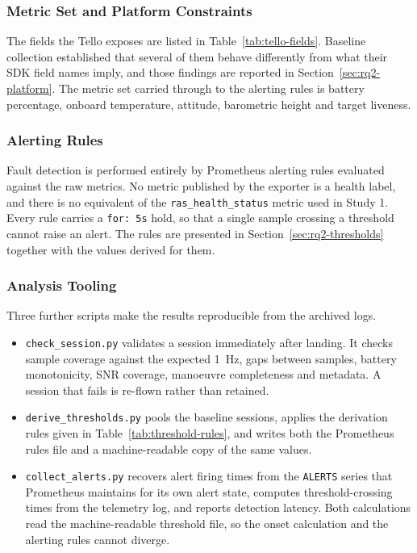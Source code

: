 \subsubsection{Metric Set and Platform Constraints}\label{sec:rq2-metrics}

The fields the Tello exposes are listed in Table~\ref{tab:tello-fields}.
Baseline collection established that several of them behave differently from
what their SDK field names imply, and those findings are reported in
Section~\ref{sec:rq2-platform}. The metric set carried through to the alerting
rules is battery percentage, onboard temperature, attitude, barometric height
and target liveness.

\subsubsection{Alerting Rules}\label{sec:rq2-rules}

Fault detection is performed entirely by Prometheus alerting rules evaluated
against the raw metrics. No metric published by the exporter is a health label,
and there is no equivalent of the \texttt{ras\_health\_status} metric used in
Study 1. Every rule carries a \texttt{for: 5s} hold, so that a single sample
crossing a threshold cannot raise an alert. The rules are presented in
Section~\ref{sec:rq2-thresholds} together with the values derived for them.

\subsubsection{Analysis Tooling}\label{sec:rq2-tooling}

Three further scripts make the results reproducible from the archived logs.

\begin{itemize}
    \item \texttt{check\_session.py} validates a session immediately after
    landing. It checks sample coverage against the expected \SI{1}{\hertz},
    gaps between samples, battery monotonicity, SNR coverage, manoeuvre
    completeness and metadata. A session that fails is re-flown rather than
    retained.
    \item \texttt{derive\_thresholds.py} pools the baseline sessions, applies
    the derivation rules given in Table~\ref{tab:threshold-rules}, and writes
    both the Prometheus rules file and a machine-readable copy of the same
    values.
    \item \texttt{collect\_alerts.py} recovers alert firing times from the
    \texttt{ALERTS} series that Prometheus maintains for its own alert state,
    computes threshold-crossing times from the telemetry log, and reports
    detection latency. Both calculations read the machine-readable threshold
    file, so the onset calculation and the alerting rules cannot diverge.
\end{itemize}

